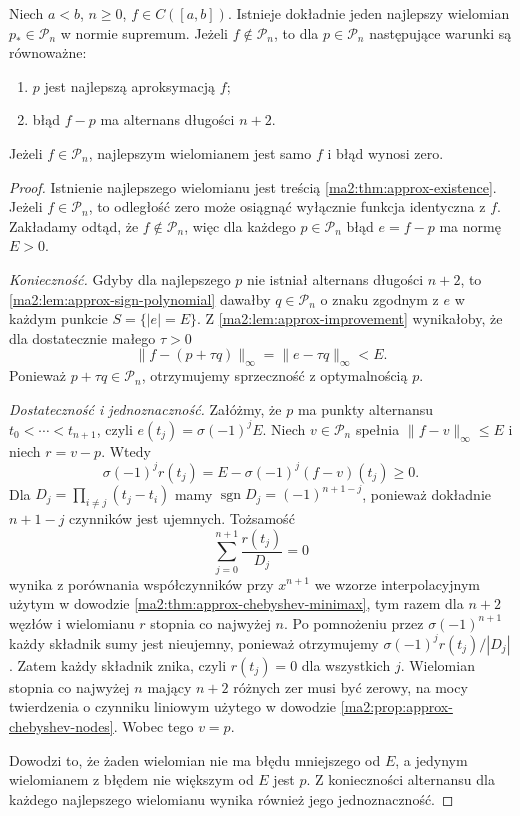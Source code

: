 \begin{twierdzenie}
\label{ma2:thm:approx-alternance}
Niech $a<b$, $n\ge0$, $f\in C([a,b])$.
Istnieje dokładnie jeden najlepszy wielomian
$p_*\in\mathcal P_n$ w normie supremum.
Jeżeli $f\notin\mathcal P_n$, to dla
$p\in\mathcal P_n$ następujące warunki
są równoważne:
\begin{enumerate}
 \item $p$ jest najlepszą aproksymacją $f$;
 \item błąd $f-p$ ma alternans długości $n+2$.
\end{enumerate}
Jeżeli $f\in\mathcal P_n$, najlepszym wielomianem
jest samo $f$ i błąd wynosi zero.
\end{twierdzenie}
\begin{proof}
Istnienie najlepszego wielomianu jest treścią
\ref{ma2:thm:approx-existence}.
Jeżeli $f\in\mathcal P_n$, to odległość zero
może osiągnąć wyłącznie funkcja identyczna z $f$.
Zakładamy odtąd, że $f\notin\mathcal P_n$,
więc dla każdego $p\in\mathcal P_n$ błąd
$e=f-p$ ma normę $E>0$.

\emph{Konieczność.}
Gdyby dla najlepszego $p$ nie istniał alternans
długości $n+2$, to
\ref{ma2:lem:approx-sign-polynomial} dawałby
$q\in\mathcal P_n$ o znaku zgodnym z $e$
w każdym punkcie $S=\{|e|=E\}$.
Z \ref{ma2:lem:approx-improvement} wynikałoby,
że dla dostatecznie małego $\tau>0$
\[
 \|f-(p+\tau q)\|_\infty
 =\|e-\tau q\|_\infty<E.
\]
Ponieważ $p+\tau q\in\mathcal P_n$,
otrzymujemy sprzeczność z optymalnością $p$.

\emph{Dostateczność i jednoznaczność.}
Załóżmy, że $p$ ma punkty alternansu
$t_0<\cdots<t_{n+1}$, czyli
$e(t_j)=\sigma(-1)^jE$.
Niech $v\in\mathcal P_n$ spełnia
$\|f-v\|_\infty\le E$ i niech $r=v-p$.
Wtedy
\[
 \sigma(-1)^j r(t_j)
 = E-\sigma(-1)^j(f-v)(t_j)\ge0.
\]
Dla $D_j=\prod_{i\ne j}(t_j-t_i)$
mamy $\operatorname{sgn}D_j=(-1)^{n+1-j}$,
ponieważ dokładnie $n+1-j$ czynników jest ujemnych.
Tożsamość
\[
 \sum_{j=0}^{n+1}\frac{r(t_j)}{D_j}=0
\]
wynika z porównania współczynników przy $x^{n+1}$
we wzorze interpolacyjnym użytym w dowodzie
\ref{ma2:thm:approx-chebyshev-minimax},
tym razem dla $n+2$ węzłów i wielomianu
$r$ stopnia co najwyżej $n$.
Po pomnożeniu przez $\sigma(-1)^{n+1}$
każdy składnik sumy jest nieujemny,
ponieważ otrzymujemy
$\sigma(-1)^j r(t_j)/|D_j|$.
Zatem każdy składnik znika,
czyli $r(t_j)=0$ dla wszystkich $j$.
Wielomian stopnia co najwyżej $n$ mający
$n+2$ różnych zer musi być zerowy, na mocy
twierdzenia o czynniku liniowym użytego w dowodzie
\ref{ma2:prop:approx-chebyshev-nodes}.
Wobec tego $v=p$.

Dowodzi to, że żaden wielomian nie ma
błędu mniejszego od $E$, a jedynym
wielomianem z błędem nie większym od $E$
jest $p$. Z konieczności alternansu dla
każdego najlepszego wielomianu wynika
również jego jednoznaczność.
\end{proof}

